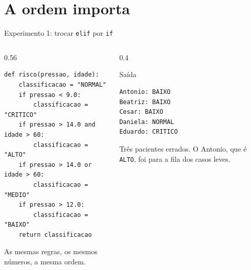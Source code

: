 \documentclass[aspectratio=169]{beamer}
\newcommand{\code}[1]{\texttt{\small #1}}
\begin{document}
\section{A ordem importa}

\begin{frame}[fragile]{Experimento 1: trocar \texttt{elif} por \texttt{if}}
  \begin{columns}[T]
    \begin{column}{0.56\textwidth}
\begin{lstlisting}
def risco(pressao, idade):
    classificacao = "NORMAL"
    if pressao < 9.0:
        classificacao = "CRITICO"
    if pressao > 14.0 and idade > 60:
        classificacao = "ALTO"
    if pressao > 14.0 or idade > 60:
        classificacao = "MEDIO"
    if pressao > 12.0:
        classificacao = "BAIXO"
    return classificacao
\end{lstlisting}
      {\small As mesmas regras, os mesmos números, a mesma ordem.}
    \end{column}
    \begin{column}{0.4\textwidth}
      \begin{alertblock}{Saída}
\begin{lstlisting}[style=saida]
Antonio: BAIXO
Beatriz: BAIXO
Cesar: BAIXO
Daniela: NORMAL
Eduardo: CRITICO
\end{lstlisting}
      \end{alertblock}
      {\small Três pacientes errados. O Antonio, que é \code{ALTO},
      foi para a fila dos casos leves.}
    \end{column}
  \end{columns}
\end{frame}
\end{document}
